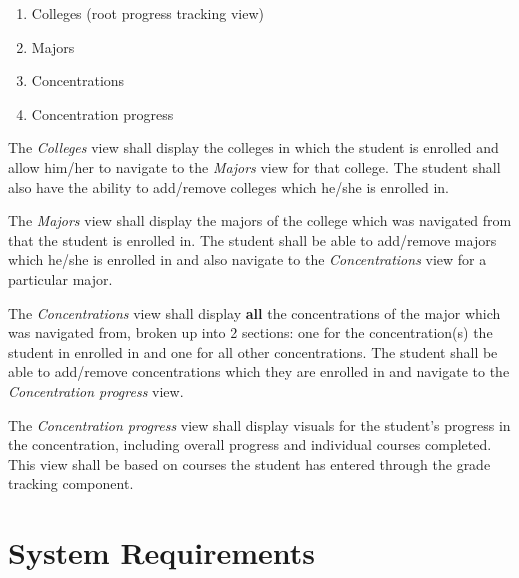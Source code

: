 \documentclass[12pt]{article}
\begin{document}
\begin{enumerate}
    \item Colleges (root progress tracking view)
    \item Majors
    \item Concentrations
    \item Concentration progress
\end{enumerate}

The \textit{Colleges} view shall display the colleges in which the student is enrolled and allow
him/her to navigate to the \textit{Majors} view for that college. The student shall also have the
ability to add/remove colleges which he/she is enrolled in.

The \textit{Majors} view shall display the majors of the college which was navigated from that the
student is enrolled in. The student shall be able to add/remove majors which he/she is enrolled in
and also navigate to the \textit{Concentrations} view for a particular major.

The \textit{Concentrations} view shall display \textbf{all} the concentrations of the major which
was navigated from, broken up into 2 sections: one for the concentration(s) the student in enrolled
in and one for all other concentrations. The student shall be able to add/remove concentrations
which they are enrolled in and navigate to the \textit{Concentration progress} view.

The \textit{Concentration progress} view shall display visuals for the student's progress in the
concentration, including overall progress and individual courses completed. This view shall be based
on courses the student has entered through the grade tracking component.

\section{System Requirements}
\end{document}
